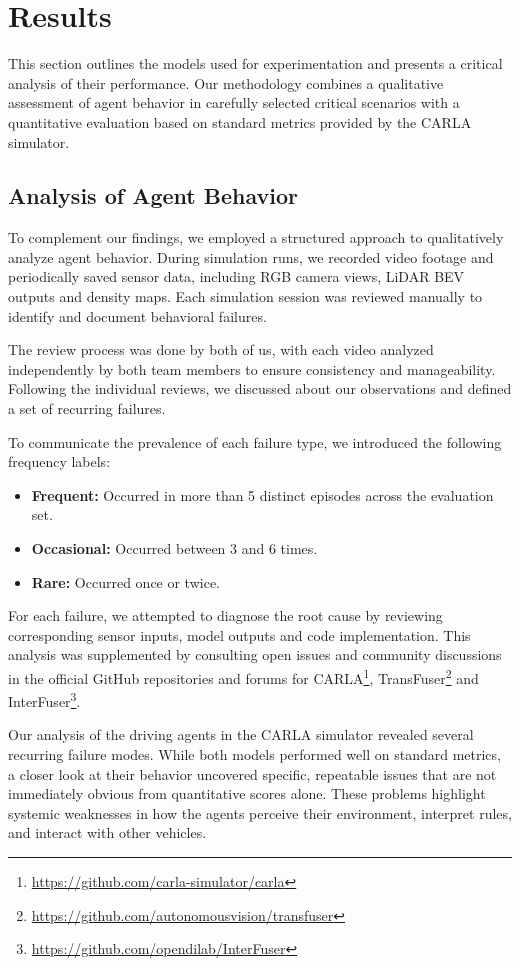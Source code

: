 \section{Results}
This section outlines the models used for experimentation and presents a critical analysis of their performance. Our methodology combines a qualitative assessment of agent behavior in carefully selected critical scenarios with a quantitative evaluation based on standard metrics provided by the CARLA simulator.

\subsection{Analysis of Agent Behavior}
To complement our findings, we employed a structured approach to qualitatively analyze agent behavior. During simulation runs, we recorded video footage and periodically saved sensor data, including RGB camera views, LiDAR BEV outputs and density maps. Each simulation session was reviewed manually to identify and document behavioral failures.

The review process was done by both of us, with each video analyzed independently by both team members to ensure consistency and manageability. Following the individual reviews, we discussed about our observations and defined a set of recurring failures.

To communicate the prevalence of each failure type, we introduced the following frequency labels:
\begin{itemize}
    \item\textbf{Frequent:} Occurred in more than 5 distinct episodes across the evaluation set.
    \item\textbf{Occasional:} Occurred between 3 and 6 times.
    \item\textbf{Rare:} Occurred once or twice.
\end{itemize}
For each failure, we attempted to diagnose the root cause by reviewing corresponding sensor inputs, model outputs and code implementation. This analysis was supplemented by consulting open issues and community discussions in the official GitHub repositories and forums for CARLA\footnote{\url{https://github.com/carla-simulator/carla}}, TransFuser\footnote{\url{https://github.com/autonomousvision/transfuser}} and InterFuser\footnote{\url{https://github.com/opendilab/InterFuser}}.

Our analysis of the driving agents in the CARLA simulator revealed several recurring failure modes. While both models performed well on standard metrics, a closer look at their behavior uncovered specific, repeatable issues that are not immediately obvious from quantitative scores alone. These problems highlight systemic weaknesses in how the agents perceive their environment, interpret rules, and interact with other vehicles.

